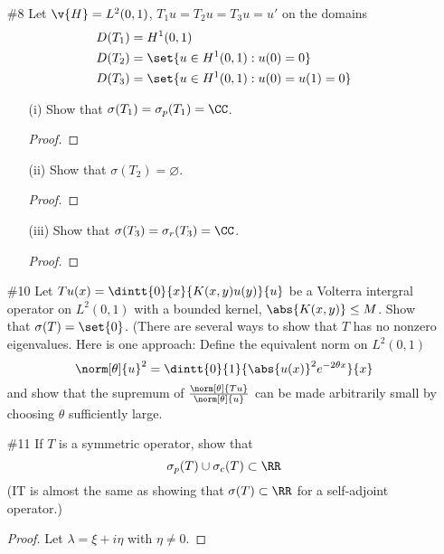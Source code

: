 \documentclass[11pt, oneside]{article}
\begin{document}
\begin{enumerate}
  \pagebreak
  \item[\#8]
    Let $\v{H} = L^2(0, 1)$, $T_1 u = T_2 u = T_3 u = u'$ on the domains
    \begin{align*}
      D(T_1) &= H^1(0, 1) \\
      D(T_2) &= \set{u \in H^1(0,1): u(0) = 0} \\
      D(T_3) &= \set{u \in H^1(0, 1): u(0) = u(1) = 0}
    \end{align*}
    \begin{enumerate}
      \item[(i)]
        Show that $\sigma(T_1) = \sigma_p(T_1) = \CC$.

        \begin{proof}
          
        \end{proof}

      \item[(ii)]
        Show that $\sigma(T_2) = \varnothing$.

        \begin{proof}
          
        \end{proof}

      \item[(iii)]
        Show that $\sigma(T_3) = \sigma_r(T_3) = \CC$.

        \begin{proof}
          
        \end{proof}
    \end{enumerate}

  \pagebreak
  \item[\#10]
    Let $Tu(x) = \dintt{0}{x}{K(x, y)u(y)}{u}$ be a Volterra intergral operator
    on $L^2(0, 1)$ with a bounded kernel, $\abs{K(x, y)} \le M$.
    Show that $\sigma(T) = \set{0}$.
    (There are several ways to show that $T$ has no nonzero eigenvalues.
    Here is one approach: Define the equivalent norm on $L^2(0, 1)$
    \[
      \norm[\theta]{u}^2 = \dintt{0}{1}{\abs{u(x)}^2e^{-2\theta x}}{x}
    \]
    and show that the supremum of $\frac{\norm[\theta]{Tu}}{\norm[\theta]{u}}$
    can be made arbitrarily small by choosing $\theta$ sufficiently large.

  \pagebreak
  \item[\#11]
    If $T$ is a symmetric operator, show that
    \[
      \sigma_p(T) \cup \sigma_c(T) \subset \RR
    \]
    (IT is almost the same as showing that $\sigma(T) \subset \RR$ for a
    self-adjoint operator.)

    \begin{proof}
      Let $\lambda = \xi + i \eta$ with $\eta \neq 0$.
    \end{proof}
\end{enumerate}
\end{document}
